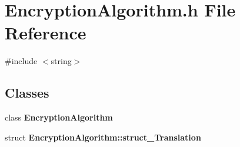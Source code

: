 \section{Encryption\+Algorithm.\+h File Reference}
\label{EncryptionAlgorithm_8h}
{\ttfamily \#include $<$string$>$}\newline
\subsection*{Classes}
\begin{DoxyCompactItemize}
\item 
class \textbf{ Encryption\+Algorithm}
\item 
struct \textbf{ Encryption\+Algorithm\+::struct\+\_\+\+Translation}
\end{DoxyCompactItemize}
